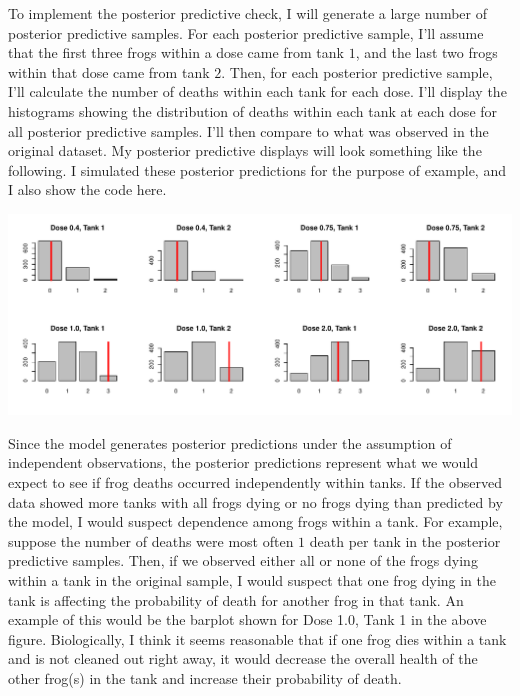 \documentclass[12pt]{article}\usepackage[]{graphicx}\usepackage[]{color}
\newenvironment{knitrout}{}{} %
\begin{document}
\begin{enumerate}
\begin{enumerate}
To implement the posterior predictive check, I will generate a large number of posterior predictive samples. For each posterior predictive sample, I'll assume that the first three frogs within a dose came from tank $1$, and the last two frogs within that dose came from tank $2$. Then, for each posterior predictive sample, I'll calculate the number of deaths within each tank for each dose. I'll display the histograms showing the distribution of deaths within each tank at each dose for all posterior predictive samples. I'll then compare to what was observed in the original dataset. My posterior predictive displays will look something like the following. I simulated these posterior predictions for the purpose of example, and I also show the code here.



\begin{knitrout}\footnotesize
{}\color{fgcolor}
\includegraphics[width=\linewidth]{figure/exdisplay-1} 

\end{knitrout}

Since the model generates posterior predictions under the assumption of independent observations, the posterior predictions represent what we would expect to see if frog deaths occurred independently within tanks. If the observed data showed more tanks with all frogs dying or no frogs dying than predicted by the model, I would suspect dependence among frogs within a tank. For example, suppose the number of deaths were most often $1$ death per tank in the posterior predictive samples. Then, if we observed either all or none of the frogs dying within a tank in the original sample, I would suspect that one frog dying in the tank is affecting the probability of death for another frog in that tank. An example of this would be the barplot shown for Dose 1.0, Tank 1 in the above figure. Biologically, I think it seems reasonable that if one frog dies within a tank and is not cleaned out right away, it would decrease the overall health of the other frog(s) in the tank and increase their probability of death.


\end{enumerate}
\end{enumerate}
\end{document}
